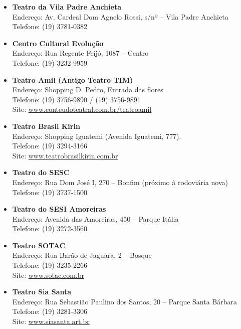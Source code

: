 \begin{itemize}
\item   \textbf{Teatro da Vila Padre Anchieta}
		\\Endereço: Av. Cardeal Dom Agnelo Rossi, s/nº -- Vila Padre Anchieta
		\\Telefone: (19) 3781-0382

\item   \textbf{Centro Cultural Evolução}
		\\Endereço: Rua Regente Feijó, 1087 -- Centro
		\\Telefone: (19) 3232-9959

\item   \textbf{Teatro Amil (Antigo Teatro TIM)}
		\\Endereço: Shopping D. Pedro, Entrada das flores
		\\Telefone: (19) 3756-9890 / (19) 3756-9891
		\\Site: \url{www.conteudoteatral.com.br/teatroamil}

\item   \textbf{Teatro Brasil Kirin}
		\\Endereço: Shopping Iguatemi (Avenida Iguatemi, 777).
		\\Telefone: (19) 3294-3166
		\\Site: \url{www.teatrobrasilkirin.com.br}

\item   \textbf{Teatro do SESC}
		\\Endereço: Rua Dom José I, 270 -- Bonfim (próximo à rodoviária nova)
		\\Telefone: (19) 3737-1500

\item   \textbf{Teatro do SESI Amoreiras}
		\\Endereço: Avenida das Amoreiras, 450 -- Parque Itália
		\\Telefone: (19) 3272-3560

\item   \textbf{Teatro SOTAC}
		\\Endereço: Rua Barão de Jaguara, 2 -- Bosque
		\\Telefone: (19) 3235-2266
		\\Site: \url{www.sotac.com.br}

\item   \textbf{Teatro Sia Santa}
		\\Endereço: Rua Sebastião Paulino dos Santos, 20 -- Parque Santa Bárbara
		\\Telefone: (19) 3281-3306
		\\Site: \url{www.siasanta.art.br}

\end{itemize}


